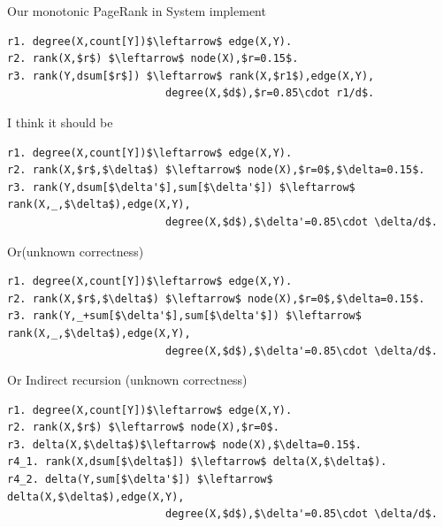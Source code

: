 \begin{appendix}
Our monotonic PageRank in System implement
\begin{lstlisting}
r1. degree(X,count[Y])$\leftarrow$ edge(X,Y).
r2. rank(X,$r$) $\leftarrow$ node(X),$r=0.15$.
r3. rank(Y,dsum[$r$]) $\leftarrow$ rank(X,$r1$),edge(X,Y),
                         degree(X,$d$),$r=0.85\cdot r1/d$.
\end{lstlisting}

I think it should be
\begin{lstlisting}
r1. degree(X,count[Y])$\leftarrow$ edge(X,Y).
r2. rank(X,$r$,$\delta$) $\leftarrow$ node(X),$r=0$,$\delta=0.15$.
r3. rank(Y,dsum[$\delta'$],sum[$\delta'$]) $\leftarrow$ rank(X,_,$\delta$),edge(X,Y),
                         degree(X,$d$),$\delta'=0.85\cdot \delta/d$.
\end{lstlisting}
Or(unknown correctness)
\begin{lstlisting}
r1. degree(X,count[Y])$\leftarrow$ edge(X,Y).
r2. rank(X,$r$,$\delta$) $\leftarrow$ node(X),$r=0$,$\delta=0.15$.
r3. rank(Y,_+sum[$\delta'$],sum[$\delta'$]) $\leftarrow$ rank(X,_,$\delta$),edge(X,Y),
                         degree(X,$d$),$\delta'=0.85\cdot \delta/d$.
\end{lstlisting}
Or Indirect recursion (unknown correctness)
\begin{lstlisting}
r1. degree(X,count[Y])$\leftarrow$ edge(X,Y).
r2. rank(X,$r$) $\leftarrow$ node(X),$r=0$.
r3. delta(X,$\delta$)$\leftarrow$ node(X),$\delta=0.15$.
r4_1. rank(X,dsum[$\delta$]) $\leftarrow$ delta(X,$\delta$).
r4_2. delta(Y,sum[$\delta'$]) $\leftarrow$ delta(X,$\delta$),edge(X,Y),
                         degree(X,$d$),$\delta'=0.85\cdot \delta/d$.
\end{lstlisting}

\end{appendix}
